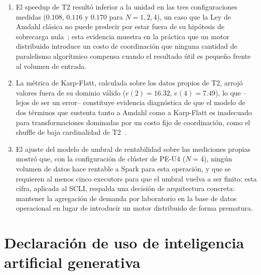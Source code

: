 \documentclass[10pt,journal]{IEEEtran}
\begin{document}
\begin{enumerate}
\item El speedup de T2 result\'o inferior a la unidad en las tres
configuraciones medidas ($0.108$, $0.116$ y $0.170$ para $N=1,2,4$), un caso
que la Ley de Amdahl cl\'asica no puede predecir por estar fuera de su
hip\'otesis de sobrecarga nula~\cite{amdahl1967,hillmarty2008}; esta evidencia
muestra en la pr\'actica que un motor distribuido introduce un costo de
coordinaci\'on que ninguna cantidad de paralelismo algor\'itmico compensa
cuando el resultado \'util es peque\~no frente al volumen de entrada.

\item La m\'etrica de Karp-Flatt, calculada sobre los datos propios de T2,
arroj\'o valores fuera de su dominio v\'alido ($e(2)=16.32$, $e(4)=7.49$), lo
que --lejos de ser un error-- constituye evidencia diagn\'ostica de que el
modelo de dos t\'erminos que sustenta tanto a Amdahl como a Karp-Flatt es
inadecuado para transformaciones dominadas por un costo fijo de
coordinaci\'on, como el shuffle de baja cardinalidad de
T2~\cite{karpflatt1990,sparker2021}.

\item El ajuste del modelo de umbral de rentabilidad sobre las mediciones
propias mostr\'o que, con la configuraci\'on de cl\'uster de PE-U4 ($N=4$),
ning\'un volumen de datos hace rentable a Spark para esta operaci\'on, y que
se requieren al menos cinco executors para que el umbral vuelva a ser finito;
esta cifra, aplicada al SCLI, respalda una decisi\'on de arquitectura
concreta: mantener la agregaci\'on de demanda por laboratorio en la base de
datos operacional en lugar de introducir un motor distribuido de forma
prematura.
\end{enumerate}

\section{Declaraci\'on de uso de inteligencia artificial generativa}
\label{sec:ia}
\end{document}
